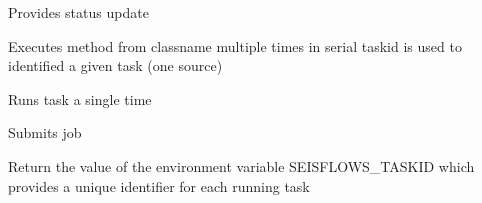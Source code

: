 \documentclass[letterpaper,10pt,english]{sphinxmanual}
\begin{document}
\begin{fulllineitems}
\begin{fulllineitems}
\end{fulllineitems}


\begin{fulllineitems}
\label{\detokenize{ref/seisflows.system:seisflows.system.serial.serial.progress}}
Provides status update

\end{fulllineitems}


\begin{fulllineitems}
\label{\detokenize{ref/seisflows.system:seisflows.system.serial.serial.run}}
Executes method from classname multiple times in serial
taskid is used to identified a given task (one source)

\end{fulllineitems}


\begin{fulllineitems}
\label{\detokenize{ref/seisflows.system:seisflows.system.serial.serial.run_single}}
Runs task a single time

\end{fulllineitems}


\begin{fulllineitems}
\label{\detokenize{ref/seisflows.system:seisflows.system.serial.serial.submit}}
Submits job

\end{fulllineitems}


\begin{fulllineitems}
\label{\detokenize{ref/seisflows.system:seisflows.system.serial.serial.taskid}}
Return the value of the environment variable SEISFLOWS\_TASKID
which provides a unique identifier for each running task

\end{fulllineitems}


\end{fulllineitems}
\end{document}
